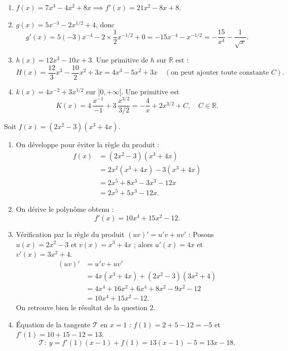 \documentclass[11pt]{article}
\begin{document}
\begin{corrige}
\begin{enumerate}
    \item $f(x)=7x^3-4x^2+8x \implies f'(x)=21x^2-8x+8$.
    \item $g(x)=5x^{-3}-2x^{1/2}+4$, donc
    \[ g'(x)=5(-3)x^{-4}-2\times\frac12 x^{-1/2}+0 = -15x^{-4}-x^{-1/2} = -\frac{15}{x^4}-\frac{1}{\sqrt{x}}. \]
    \item $h(x)=12x^2-10x+3$. Une primitive de $h$ sur $\mathbb{R}$ est :
    \[ H(x)=\frac{12}{3}x^3-\frac{10}{2}x^2+3x = 4x^3-5x^2+3x \quad (\text{on peut ajouter toute constante } C). \]
    \item $k(x)=4x^{-2}+3x^{1/2}$ sur $]0,+\infty[$. Une primitive est
    \[ K(x)=4\,\frac{x^{-1}}{-1}+3\,\frac{x^{3/2}}{3/2} = -\frac{4}{x}+2x^{3/2} + C,\quad C\in\mathbb{R}. \]
\end{enumerate}
\end{corrige}

\begin{corrige}
Soit $f(x)=(2x^2-3)(x^3+4x)$.
\begin{enumerate}
    \item On développe pour éviter la règle du produit :
    \begin{align*}
    f(x)&=(2x^2-3)(x^3+4x)\\
    &=2x^2(x^3+4x)-3(x^3+4x)\\
    &=2x^5+8x^3-3x^3-12x\\
    &=2x^5+5x^3-12x.
    \end{align*}
    \item On dérive le polynôme obtenu :
    \[ f'(x)=10x^4+15x^2-12. \]
    \item Vérification par la règle du produit $(uv)'=u'v+uv'$ :
    Posons $u(x)=2x^2-3$ et $v(x)=x^3+4x$ ; alors $u'(x)=4x$ et $v'(x)=3x^2+4$.
    \begin{align*}
    (uv)'&=u'v+uv'\\
    &=4x(x^3+4x)+(2x^2-3)(3x^2+4)\\
    &=4x^4+16x^2+6x^4+8x^2-9x^2-12\\
    &=10x^4+15x^2-12.
    \end{align*}
    On retrouve bien le résultat de la question 2.
    \item Équation de la tangente $\mathcal{T}$ en $x=1$ :
    $f(1)=2+5-12=-5$ et $f'(1)=10+15-12=13$.
    \[ \mathcal{T}:\ y=f'(1)(x-1)+f(1)=13(x-1)-5=13x-18. \]
\end{enumerate}
\end{corrige}
\end{document}
